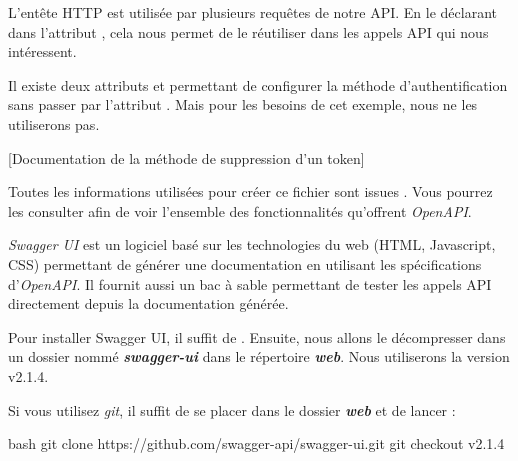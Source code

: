 \documentclass[big]{zmdocument}
\begin{document}
L'entête HTTP  est utilisée par plusieurs requêtes de notre API. En le déclarant dans l'attribut , cela nous permet de le réutiliser dans les appels API qui nous intéressent.



\begin{Information}
Il existe deux attributs  et  permettant de configurer la méthode d'authentification sans passer par l'attribut . Mais pour les besoins de cet exemple, nous ne les utiliserons pas.
\end{Information}


[Documentation de la méthode de suppression d'un token]


Toutes les informations utilisées pour créer ce fichier sont issues . Vous pourrez les consulter afin de voir l'ensemble des fonctionnalités qu'offrent \textit{OpenAPI}.





\textit{Swagger UI} est un logiciel basé sur les technologies du web (HTML, Javascript, CSS) permettant de générer une documentation en utilisant les spécifications d'\textit{OpenAPI}. Il fournit aussi un bac à sable permettant de tester les appels API directement depuis la documentation générée.





Pour installer Swagger UI, il suffit de . Ensuite, nous allons le décompresser dans un dossier nommé \textbf{\textit{swagger-ui}} dans le répertoire \textbf{\textit{web}}. Nous utiliserons la version v2.1.4.



\begin{Information}
Si vous utilisez \textit{git}, il suffit de se placer dans le dossier \textbf{\textit{web}} et de lancer :

\begin{CodeBlock}{bash}
git clone https://github.com/swagger-api/swagger-ui.git
git checkout v2.1.4
\end{CodeBlock}
\end{Information}
\end{document}
